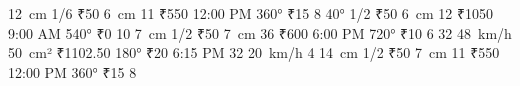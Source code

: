 \answerkey
{} 12 cm
 1/6
 ₹50
 6 cm
 11
 ₹550
 12:00 PM
 360°
 ₹15
 8
 40°
 1/2
 ₹50
 6 cm
 12
 ₹1050
 9:00 AM
 540°
 ₹0
 10
 7 cm
 1/2
 ₹50
 7 cm
 36
 ₹600
 6:00 PM
 720°
 ₹10
 6
 32
 48 km/h
 50 cm²
 ₹1102.50
 180°
 ₹20
 6:15 PM
 32
 20 km/h
 4
 14 cm
 1/2
 ₹50
 7 cm
 11
 ₹550
 12:00 PM
 360°
 ₹15
 8
\endanswerkey